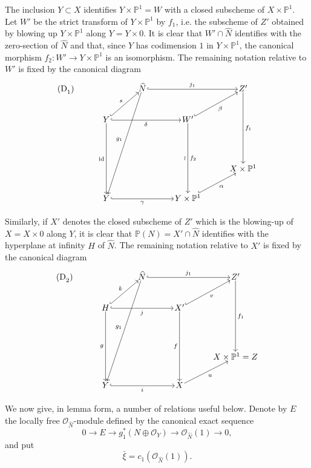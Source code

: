 The inclusion $Y\subset X$ identifies $Y\times\mathbb P^1=W$ with a closed subscheme of $X\times\mathbb P^1$. Let $W'$ be the strict transform of $Y\times\mathbb P^1$ by $f_1$, i.e. the subscheme of $Z'$ obtained by blowing up $Y\times\mathbb P^1$ along $Y=Y\times0$. It is clear that $W'\cap\widehat N$ identifies with the zero-section of $\widehat N$ and that, since $Y$ has codimension $1$ in $Y\times\mathbb P^1$, the canonical morphism $f_2:W'\to Y\times\mathbb P^1$ is an isomorphism. The remaining notation relative to $W'$ is fixed by the canonical diagram
\[
\begin{tikzcd}[column sep=3.2em,row sep=2.4em,cells={nodes={inner sep=1pt}}]
\text{(D}_1\text{)}\arrow[from=1-3,to=5-2,"g_1"']
& & \widehat N \arrow[rr,hook,"j_1"] & & Z' \arrow[ddd,"f_1"] \\
& Y \arrow[ur,hook,"s"] \arrow[rr,hook,"\delta"'] \arrow[ddd,"\mathrm{id}"'] & &
W' \arrow[ur,hook,"\beta"'] \arrow[ddd,"\wr"',"f_2"] & \\
& & & & \\
& & & & X\times\mathbb P^1 \\
& Y \arrow[rr,hook,"\gamma"'] & & Y\times\mathbb P^1 \arrow[ur,hook,"\alpha"'] &
\end{tikzcd}
\]

Similarly, if $X'$ denotes the closed subscheme of $Z'$ which is the blowing-up of $X=X\times0$ along $Y$, it is clear that $\mathbb P(N)=X'\cap\widehat N$ identifies with the hyperplane at infinity $H$ of $\widehat N$. The remaining notation relative to $X'$ is fixed by the canonical diagram
\[
\begin{tikzcd}[column sep=3.2em,row sep=2.4em,cells={nodes={inner sep=1pt}}]
\text{(D}_2\text{)}\arrow[from=1-3,to=5-2,"g_1"']
& & \widehat N \arrow[rr,hook,"j_1"] & & Z' \arrow[ddd,"f_1"] \\
& H \arrow[ur,hook,"k"] \arrow[rr,hook,"j"'] \arrow[ddd,"g"'] & &
X' \arrow[ur,hook,"v"'] \arrow[ddd,"f"'] & \\
& & & & \\
& & & & X\times\mathbb P^1=Z \\
& Y \arrow[rr,hook,"i"'] & & X \arrow[ur,"u"'] &
\end{tikzcd}
\]

We now give, in lemma form, a number of relations useful below. Denote by $E$ the locally free $\mathcal O_{\widehat N}$-module defined by the canonical exact sequence
\[
0\to E\to g_1^*(N\oplus\mathcal O_Y)\to\mathcal O_{\widehat N}(1)\to0,
\tag{9.3.0}
\]
and put
\[
\bar\xi=c_1(\mathcal O_{\widehat N}(1)).
\tag{9.3.1}
\]

